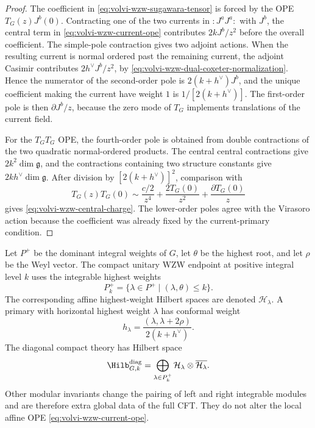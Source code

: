 \begin{proof}
The coefficient in \eqref{eq:volvi-wzw-sugawara-tensor} is forced by the
OPE \(T_G(z)J^b(0)\).  Contracting one of the two currents in
\(:J^aJ^a:\) with \(J^b\), the central term in
\eqref{eq:volvi-wzw-current-ope} contributes \(2kJ^b/z^2\) before the
overall coefficient.  The simple-pole contraction gives two adjoint actions.
When the resulting current is normal ordered past the remaining current, the
adjoint Casimir contributes \(2h^\vee J^b/z^2\), by
\eqref{eq:volvi-wzw-dual-coxeter-normalization}.  Hence the numerator of the
second-order pole is \(2(k+h^\vee)J^b\), and the unique coefficient making
the current have weight \(1\) is \(1/[2(k+h^\vee)]\).  The first-order pole
is then \(\partial J^b/z\), because the zero mode of \(T_G\) implements
translations of the current field.

For the \(T_GT_G\) OPE, the fourth-order pole is obtained from double
contractions of the two quadratic normal-ordered products.  The central
central contractions give \(2k^2\dim\mathfrak g\), and the contractions
containing two structure constants give \(2kh^\vee\dim\mathfrak g\).  After
division by \([2(k+h^\vee)]^2\), comparison with
\[
  T_G(z)T_G(0)
  \sim
  \frac{c/2}{z^4}+\frac{2T_G(0)}{z^2}+\frac{\partial T_G(0)}{z}
\]
gives \eqref{eq:volvi-wzw-central-charge}.  The lower-order poles agree with
the Virasoro action because the coefficient was already fixed by the
current-primary condition.
\end{proof}

Let \(P^+\) be the dominant integral weights of \(G\), let \(\theta\) be the
highest root, and let \(\rho\) be the Weyl vector.  The compact unitary WZW
endpoint at positive integral level \(k\) uses the integrable highest weights
\begin{equation}
  P_k^+=\{\lambda\in P^+\mid(\lambda,\theta)\le k\}.
  \label{eq:volvi-wzw-integrable-weights}
\end{equation}
The corresponding affine highest-weight Hilbert spaces are denoted
\(\mathcal H_\lambda\).  A primary with horizontal highest weight
\(\lambda\) has conformal weight
\begin{equation}
  h_\lambda
  =
  \frac{(\lambda,\lambda+2\rho)}
       {2(k+h^\vee)} .
  \label{eq:volvi-wzw-primary-weight}
\end{equation}
The diagonal compact theory has Hilbert space
\begin{equation}
  \Hilb^{\rm diag}_{G,k}
  =
  \bigoplus_{\lambda\in P_k^+}
  \mathcal H_\lambda\otimes\overline{\mathcal H_\lambda}.
  \label{eq:volvi-wzw-diagonal-hilbert-space}
\end{equation}
Other modular invariants change the pairing of left and right integrable
modules and are therefore extra global data of the full CFT.  They do not
alter the local affine OPE \eqref{eq:volvi-wzw-current-ope}.

